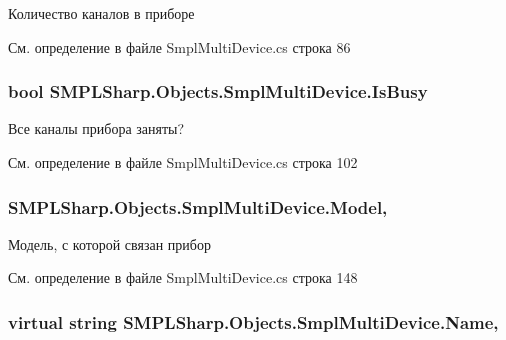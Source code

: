 Количество каналов в приборе 



См. определение в файле Smpl\-Multi\-Device.\-cs строка 86

\hypertarget{class_s_m_p_l_sharp_1_1_objects_1_1_smpl_multi_device_a20702c1214e518d92f2f9e2e8c66550e}{
\subsubsection[{Is\-Busy}]{\setlength{\rightskip}{0pt plus 5cm}bool S\-M\-P\-L\-Sharp.\-Objects.\-Smpl\-Multi\-Device.\-Is\-Busy\hspace{0.3cm}{\ttfamily [get]}}}\label{d8/d23/class_s_m_p_l_sharp_1_1_objects_1_1_smpl_multi_device_a20702c1214e518d92f2f9e2e8c66550e}


Все каналы прибора заняты? 



См. определение в файле Smpl\-Multi\-Device.\-cs строка 102

\hypertarget{class_s_m_p_l_sharp_1_1_objects_1_1_smpl_multi_device_aa5f9548873f61a77d0eda3d1a94b555d}{
\subsubsection[{Model}]{ S\-M\-P\-L\-Sharp.\-Objects.\-Smpl\-Multi\-Device.\-Model\hspace{0.3cm}{\ttfamily [get]}, {\ttfamily [set]}}}\label{d8/d23/class_s_m_p_l_sharp_1_1_objects_1_1_smpl_multi_device_aa5f9548873f61a77d0eda3d1a94b555d}


Модель, с которой связан прибор 



См. определение в файле Smpl\-Multi\-Device.\-cs строка 148

\hypertarget{class_s_m_p_l_sharp_1_1_objects_1_1_smpl_multi_device_a8120bc9019cef69077019bc59c0acfa6}{
\subsubsection[{Name}]{\setlength{\rightskip}{0pt plus 5cm}virtual string S\-M\-P\-L\-Sharp.\-Objects.\-Smpl\-Multi\-Device.\-Name\hspace{0.3cm}{\ttfamily [get]}, {\ttfamily [set]}}}\label{d8/d23/class_s_m_p_l_sharp_1_1_objects_1_1_smpl_multi_device_a8120bc9019cef69077019bc59c0acfa6}



